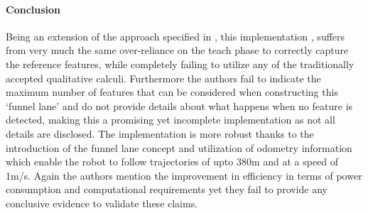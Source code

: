 	\paragraph{Conclusion}Being an extension of the approach specified in \cite{chen2006qualitative}, this implementation \cite{chen2009qualitative}, suffers from very much the same over-reliance on the teach phase to correctly capture the reference features, while completely failing to utilize any of the traditionally accepted qualitative calculi. Furthermore the authors fail to indicate the maximum number of features that can be considered when constructing this `funnel lane' and do not provide details about what happens when no feature is detected, making this a promising yet incomplete implementation as not all details are disclosed. The implementation is more robust thanks to the introduction of the funnel lane concept and utilization of odometry information which enable the robot to follow trajectories of upto 380m and at a speed of 1m/s. Again the authors mention the improvement in efficiency in terms of power consumption and computational requirements yet they fail to provide any conclusive evidence to validate these claims. 
	
